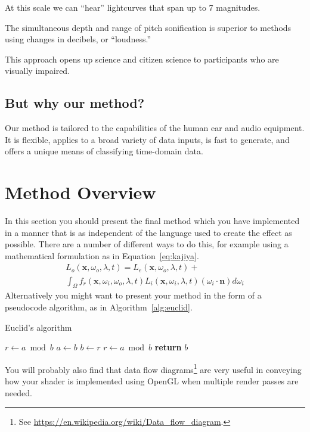 \documentclass[]{acmsiggraph}
\begin{document}
At this scale we can “hear” lightcurves that span up to 7 magnitudes. 

The simultaneous depth and range of pitch sonification is superior to methods using changes in decibels, or “loudness.”

This approach opens up science and citizen science to participants who are visually impaired.

\subsection{But why our method? }

Our method is tailored to the capabilities of the human ear and audio equipment. It is flexible, applies to a broad variety of data inputs, is fast to generate, and offers a unique means of classifying time-domain data.



\section{Method Overview} \label{sec:overview}
In this section you should present the final method which you have implemented in a manner that is as independent of the language used to create the effect as possible. There are a number of different ways to do this, for example using a mathematical formulation as in Equation~\ref{eq:kajiya}.
\begin{multline}\label{eq:kajiya}
L_o \left( \mathbf{x},\omega_o,\lambda,t \right) = L_e\left(\mathbf{x},\omega_o,\lambda,t \right) + \\
   \int_\Omega f_r \left(\mathbf{x},\omega_i,\omega_o,\lambda,t\right) L_i\left(\mathbf{x},\omega_i,\lambda,t\right) \left(\omega_i \cdot \mathbf{n}\right) d\omega_i
\end{multline}
Alternatively you might want to present your method in the form of a pseudocode algorithm, as in Algorithm~\ref{alg:euclid}. 
\begin{algorithm}
\caption{Euclid’s algorithm}\label{alg:euclid}
\begin{algorithmic}[1]
\State $r\gets a\bmod b$
\State $a\gets b$
\State $b\gets r$
\State $r\gets a\bmod b$
\EndWhile\label{euclidendwhile}
\State \textbf{return} $b$
\EndProcedure
\end{algorithmic}
\end{algorithm}
You will probably also find that data flow diagrams\footnote{See \url{https://en.wikipedia.org/wiki/Data_flow_diagram}.} are very useful in conveying how your shader is implemented using OpenGL when multiple render passes are needed.
\end{document}
